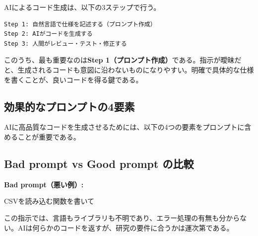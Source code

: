 AIによるコード生成は、以下の3ステップで行う。

\begin{verbatim}
Step 1: 自然言語で仕様を記述する（プロンプト作成）
Step 2: AIがコードを生成する
Step 3: 人間がレビュー・テスト・修正する
\end{verbatim}

このうち、最も重要なのは\textbf{Step 1（プロンプト作成）}である。指示が曖昧だと、生成されるコードも意図に沿わないものになりやすい。明確で具体的な仕様を書くことが、良いコードを得る鍵である。

\subsection{効果的なプロンプトの4要素}

AIに高品質なコードを生成させるためには、以下の4つの要素をプロンプトに含めることが重要である。

\begin{table}[htbp]
\centering
\caption{効果的なプロンプトの4要素}
\label{tab:prompt-elements}
\end{table}

\subsection{Bad prompt vs Good prompt の比較}

\textbf{Bad prompt（悪い例）:}

\begin{promptbox}
CSVを読み込む関数を書いて
\end{promptbox}

この指示では、言語もライブラリも不明であり、エラー処理の有無も分からない。AIは何らかのコードを返すが、研究の要件に合うかは運次第である。

